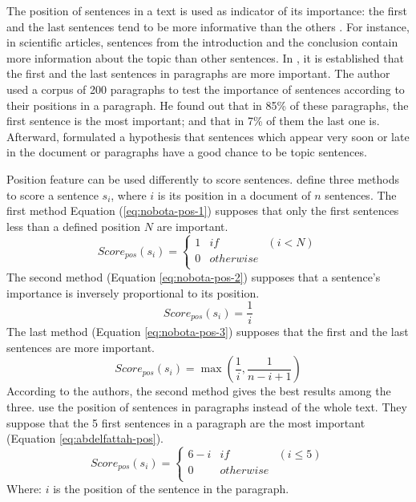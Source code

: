 The position of sentences in a text is used as indicator of its importance: the first and the last sentences tend to be more informative than the others \citep{69-edmundson}.
For instance, in scientific articles, sentences from the  introduction and the conclusion contain more information about the topic than other sentences.
In \citep{58-baxendale}, it is established that the first and the last sentences in paragraphs are more important. 
The author used a corpus of 200 paragraphs to test the importance of sentences according to their positions in a paragraph. 
He found out that in 85\% of these paragraphs, the first sentence is the most important; and that in 7\% of them the last one is.
Afterward, \citet{69-edmundson} formulated a hypothesis that sentences which appear very soon or late in the document or paragraphs have a good chance to be topic sentences.

Position feature can be used differently to score sentences.
\citet{04-nobata-sekine} define three methods to score a sentence $ s_i $, where $ i $ is its position in a document of $ n $ sentences.
The first method Equation (\ref{eq:nobota-pos-1}) supposes that only the first sentences less than a defined position $ N $ are important.
\begin{equation}
\label{eq:nobota-pos-1}
Score_{pos}(s_i) = \left\lbrace 
\begin{array}{lll}
1 & if & (i < N) \\
0 & otherwise & \\
\end{array}
\right. 
\end{equation}
The second method (Equation \ref{eq:nobota-pos-2}) supposes that a sentence's importance is inversely proportional to its position.
\begin{equation}
\label{eq:nobota-pos-2}
Score_{pos}(s_i) = \frac{1}{i}
\end{equation}
The last method (Equation \ref{eq:nobota-pos-3}) supposes that the first and the last sentences are more important.
\begin{equation}
\label{eq:nobota-pos-3}
Score_{pos}(s_i) = \max(\frac{1}{i}, \frac{1}{n-i+1})
\end{equation}
According to the authors, the second method gives the best results among the three.
%
\citet{09-abdelfattah-ren} use the position of sentences in paragraphs instead of the whole text. 
They suppose that the 5 first sentences in a paragraph are the most important (Equation \ref{eq:abdelfattah-pos}).
\begin{equation}
\label{eq:abdelfattah-pos}
Score_{pos}(s_i) = \left\lbrace 
\begin{array}{lll}
6 - i & if & (i \leq 5)\\
0 & otherwise &  \\
\end{array}
\right. 
\end{equation}
Where: $ i $ is the position of the sentence in the paragraph.

